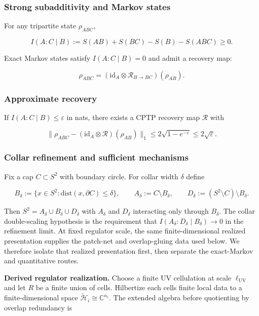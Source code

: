 \subsubsection{Strong subadditivity and Markov states}\label{21-strong-subadditivity-and-markov-states}

For any tripartite state \(\rho_{ABC}\),

\[
I(A:C \mid B) := S(AB) + S(BC) - S(B) - S(ABC) \ge 0.
\]

Exact Markov states satisfy \(I(A:C \mid B) = 0\) and admit a recovery map:

\[
\rho_{ABC} = (\mathrm{id}_A \otimes \mathcal R_{B\to BC})(\rho_{AB}).
\]

\subsubsection{Approximate recovery}\label{22-approximate-recovery}

If \(I(A:C \mid B) \le \varepsilon\) in nats, there exists a CPTP recovery map \(\mathcal{R}\) with

\[
\| \rho_{ABC} - (\mathrm{id}_A \otimes \mathcal R)(\rho_{AB}) \|_1
\le 2\sqrt{1-e^{-\varepsilon}}
\le 2\sqrt{\varepsilon}.
\]

\subsubsection{Collar refinement and sufficient mechanisms}\label{23-collar-refinement-and-sufficient-mechanisms}

Fix a cap \(C \subset S^2\) with boundary circle. For collar width \(\delta\) define

\[
B_\delta := \{x \in S^2 : \mathrm{dist}(x,\partial C) \le \delta\},
\qquad
A_\delta := C \setminus B_\delta,
\qquad
D_\delta := (S^2 \setminus C) \setminus B_\delta.
\]

Then \(S^2 = A_\delta \cup B_\delta \cup D_\delta\) with \(A_\delta\) and \(D_\delta\) interacting only through \(B_\delta\). The collar double-scaling hypothesis is the requirement that \(I(A_\delta:D_\delta \mid B_\delta) \to 0\) in the refinement limit. At fixed regulator scale, the same finite-dimensional realized presentation supplies the patch-net and overlap-gluing data used below. We therefore isolate that realized presentation first, then separate the exact-Markov and quantitative routes.

\textbf{Derived regulator realization.} Choose a finite UV cellulation at scale \(\ell_{\mathrm{UV}}\) and let \(R\) be a finite union of cells. Hilbertize each cell\textquotesingle s finite local data to a finite-dimensional space \(\tilde{\mathcal H}_i\cong \mathbb C^{n_i}\). The extended algebra before quotienting by overlap redundancy is

